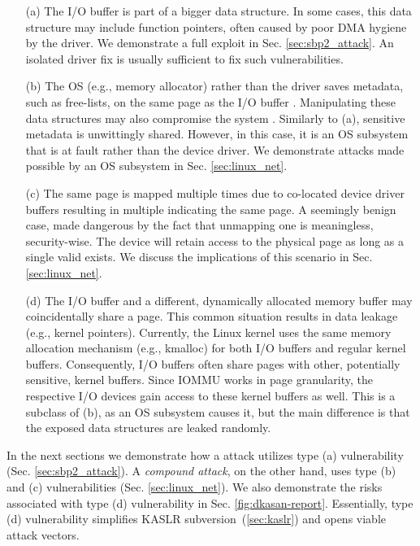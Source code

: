 \begin{enumerate}
    \item[(a)] The I/O buffer is part of a bigger data structure. In some cases, this data structure may include function pointers, often caused by poor DMA hygiene by the driver. We demonstrate a full exploit in Sec. \ref{sec:sbp2_attack}. An isolated driver fix is usually sufficient to fix such vulnerabilities.
    \item[(b)] The OS (e.g., memory allocator) rather than the driver saves metadata, such as free-lists, on the same page as the I/O buffer \cite{Cor07}. Manipulating these data structures may also compromise the system \cite{ak09}. Similarly to (a), sensitive metadata is unwittingly shared. However, in this case, it is an OS subsystem that is at fault rather than the device driver. We demonstrate attacks made possible by an OS subsystem in Sec. \ref{sec:linux_net}.
    \item[(c)] The same page is mapped multiple times due to co-located device driver buffers resulting in multiple \iova{} indicating the same page. A seemingly benign case, made dangerous by the fact that unmapping one \iova{} is meaningless, security-wise. The device will retain access to the physical page as long as a single valid \iova{} exists. We discuss the implications of this scenario in Sec. \ref{sec:linux_net}.
    \item[(d)] The I/O buffer and a different, dynamically allocated memory buffer may coincidentally share a page. This common situation results in data leakage (e.g., kernel pointers). Currently, the Linux kernel uses the same memory allocation mechanism (e.g., kmalloc) for both I/O buffers and regular kernel buffers. Consequently, I/O buffers often share pages with other, potentially sensitive, kernel buffers. Since IOMMU works in page granularity, the respective I/O devices gain access to these kernel buffers as well. This is a subclass of (b), as an OS subsystem causes it, but the main difference is that the exposed data structures are leaked randomly.

\end{enumerate}

In the next sections we demonstrate how a \simple{} attack utilizes type (a) vulnerability (Sec. \ref{sec:sbp2_attack}). A \emph{compound attack}, on the other hand, uses type (b) and (c) vulnerabilities (Sec. \ref{sec:linux_net}). 
We also demonstrate the risks associated with type (d) vulnerability in Sec. \ref{fig:dkasan-report}. Essentially, type (d) vulnerability simplifies KASLR subversion~(\ref{sec:kaslr}) and opens viable attack vectors. 


